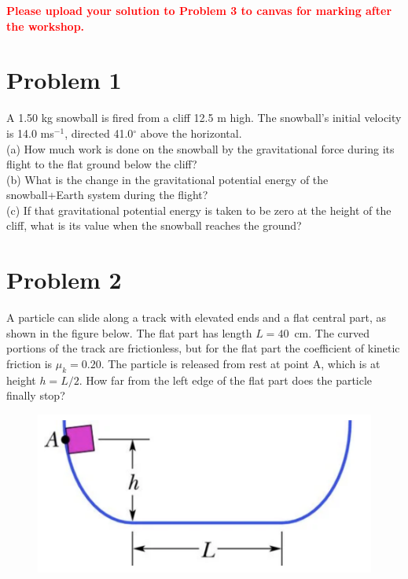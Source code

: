 \documentclass[11pt]{article}
\begin{document}
\noindent
\textbf{\textcolor{red}{Please upload your solution to Problem 3 to canvas for marking after the workshop.}}\\

\section*{Problem 1}

A 1.50 kg snowball is fired from a cliff 12.5 m high. The snowball's initial velocity is 14.0 ms$^{-1}$, directed 41.0$^{\circ}$ above the horizontal. \\
(a) How much work is done on the snowball by the gravitational force during its flight to the flat ground below the cliff?\\
(b) What is the change in the gravitational potential energy of the snowball+Earth system during the flight? \\
(c) If that gravitational potential energy is taken to be zero at the height of the cliff, what is its value when the snowball reaches the ground?\\


\noindent

\section*{Problem 2}
A particle can slide along a track with elevated ends and a flat central part, as shown in the figure below. The flat part has length $L = 40$~cm. The curved portions of the track are frictionless, but for the flat part the coefficient of kinetic friction is $\mu_k = 0.20$. The particle is released from rest at point A, which is at height $h = L/2$. How far from the left edge of the flat part does the particle finally stop?

\begin{figure}[h]
\includegraphics[scale=0.5]{2021-W6-Q2}

\end{figure}
\end{document}
